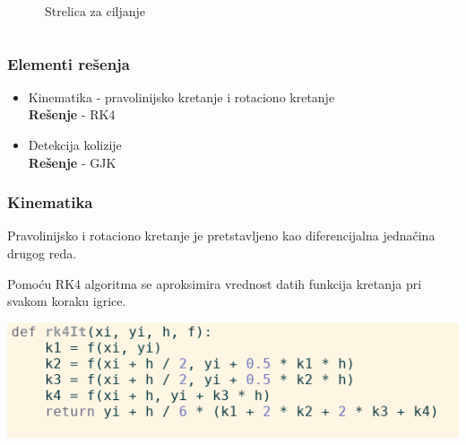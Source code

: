 \documentclass{beamer}
\begin{document}
\begin{frame}
\begin{columns}
\begin{itemize}
		\end{itemize}
		\begin{center}
		\end{center}
		\begin{center}
		Strelica za ciljanje
		\end{center}
		\vspace{2cm}
	\end{columns}
\end{frame}

\begin{frame}
	\frametitle{Elementi rešenja}
	\Large
	\begin{itemize}
		\item Kinematika - pravolinijsko kretanje i rotaciono kretanje\\
		\textbf{Rešenje} - RK4
		\item Detekcija kolizije\\
		\textbf{Rešenje} - GJK
	\end{itemize}
\end{frame}

\begin{frame}
	\frametitle{Kinematika}
	Pravolinijsko i rotaciono kretanje je pretstavljeno kao diferencijalna jednačina drugog reda.
	
	Pomoću RK4 algoritma se aproksimira vrednost datih funkcija kretanja pri svakom koraku igrice.
	
	\vspace{0.8cm}
	\begin{center}
		\includegraphics[scale=0.5]{./images/rk4.png}
	\end{center}
\end{frame}
\end{document}
